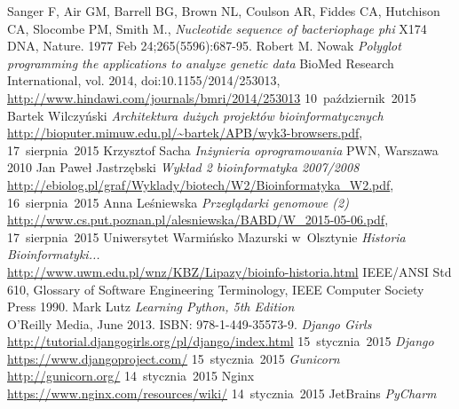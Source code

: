 \documentclass[a4paper,12pt,oneside]{mwrep}  %
\begin{document}
\begin{thebibliography}{99}
Sanger F, Air GM, Barrell BG, Brown NL, Coulson AR, Fiddes CA, Hutchison CA, Slocombe PM, Smith M., \emph{Nucleotide sequence of bacteriophage phi} X174 DNA, Nature. 1977 Feb 24;265(5596):687-95.
 Robert M. Nowak \emph{Polyglot programming the applications to analyze genetic data} BioMed Research International, vol. 2014, doi:10.1155/2014/253013, \url{http://www.hindawi.com/journals/bmri/2014/253013} \mbox{10~październik~2015}
 Bartek Wilczyński \emph{Architektura dużych projektów bioinformatycznych}\\
\url{http://bioputer.mimuw.edu.pl/~bartek/APB/wyk3-browsers.pdf}, \mbox{17~sierpnia~2015}
 Krzysztof Sacha \emph{Inżynieria oprogramowania} PWN, Warszawa 2010
Jan Paweł Jastrzębski \emph{Wykład 2 bioinformatyka 2007/2008}\\
\url{http://ebiolog.pl/graf/Wyklady/biotech/W2/Bioinformatyka_W2.pdf}, \mbox{16~sierpnia~2015}
 Anna Leśniewska \emph{Przeglądarki genomowe (2)}\\
\url{http://www.cs.put.poznan.pl/alesniewska/BABD/W_2015-05-06.pdf}, \mbox{17~sierpnia~2015}
 Uniwersytet Warmińsko Mazurski w~Olsztynie \emph{Historia Bioinformatyki...}\\ \url{http://www.uwm.edu.pl/wnz/KBZ/Lipazy/bioinfo-historia.html}
IEEE/ANSI Std 610, Glossary of Software Engineering Terminology, IEEE Computer Society Press 1990. %
 Mark Lutz \emph{Learning Python, 5th Edition}\\
O'Reilly Media, June 2013. ISBN: 978-1-449-35573-9.
 \emph{Django Girls}\\
\url{http://tutorial.djangogirls.org/pl/django/index.html} \mbox{15~stycznia~2015}
 \emph{Django}\\
\url{https://www.djangoproject.com/} \mbox{15~stycznia~2015}
 \emph{Gunicorn}\\
\url{http://gunicorn.org/} \mbox{14~stycznia~2015}
 Nginx\\
\url{https://www.nginx.com/resources/wiki/} \mbox{14~stycznia~2015}
 JetBrains \emph{PyCharm}\\

\end{thebibliography}
\end{document}
